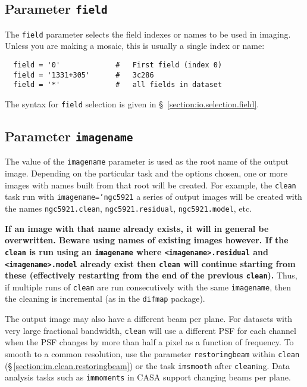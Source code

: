 \subsection{Parameter {\tt field} }
\label{section:im.pars.field}

The {\tt field} parameter selects the field indexes or names
to be used in imaging.  Unless you are making a mosaic, this
is usually a single index or name:
\small
\begin{verbatim}
  field = '0'             #   First field (index 0)
  field = '1331+305'      #   3c286
  field = '*'             #   all fields in dataset
\end{verbatim}
\normalsize

The syntax for {\tt field} selection is given in 
\S~\ref{section:io.selection.field}.

\subsection{Parameter {\tt imagename} }
\label{section:im.pars.imagename}

The value of the {\tt imagename} parameter is used as the root name
of the output image.  Depending on the particular task and the
options chosen, one or more images with names built from that root
will be created.  
For example, the {\tt clean} task run with
{\tt imagename='ngc5921} 
a series of output images will be created with the names
{\tt ngc5921.clean}, {\tt ngc5921.residual}, {\tt ngc5921.model}, etc.

{\bf If an image with that name already exists, it will in general
be overwritten.  Beware using names of existing images however.
If the {\tt clean} is run using an {\tt imagename} where 
{\tt <imagename>.residual} and {\tt <imagename>.model} already
exist then {\tt clean} will continue starting from these
(effectively restarting from the end of the previous {\tt clean}).} 
Thus, if multiple runs of {\tt clean} are run consecutively
with the same {\tt imagename}, then the cleaning is incremental
(as in the {\tt difmap} package).

The output image may also have a different beam per plane. For
datasets with very large fractional bandwidth, {\tt clean} will use a
different PSF for each channel when the PSF changes by more than half
a pixel as a function of frequency. To smooth to a common resolution,
use the parameter {\tt restoringbeam} within {\tt clean}
(\S\,\ref{section:im.clean.restoringbeam}) or the task {\tt imsmooth}
after {\tt clean}ing. Data analysis tasks such as {\tt immoments} in
CASA support changing beams per plane.

